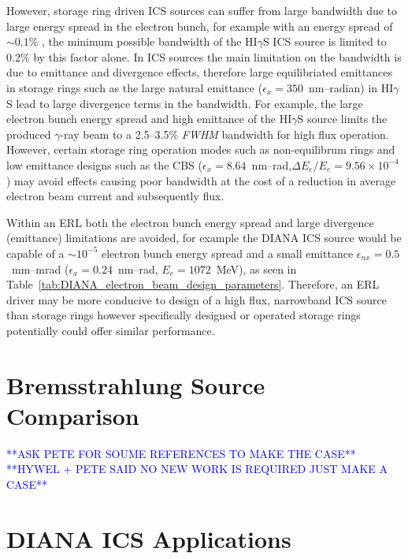 \documentclass[../main.tex]{subfiles}
\begin{document}
However, storage ring driven ICS sources can suffer from large bandwidth due to large energy spread in the electron bunch, for example with an energy spread of $\sim0.1$\% \cite{litvinenko1996intense}, the minimum possible bandwidth of the HI$\gamma$S ICS source is limited to 0.2\% by this factor alone. In ICS sources the main limitation on the bandwidth is due to emittance and divergence effects, therefore large equilibriated emittances in storage rings such as the large natural emittance ($\epsilon_{x} = 350$~\si{\nano\meter}--\si{radian}) in HI$\gamma$S \cite{weller2009research} lead to large divergence terms in the bandwidth. For example, the large electron bunch energy spread and high emittance of the HI$\gamma$S source limits the produced $\gamma$-ray beam to a 2.5--3.5\% \textit{FWHM} bandwidth \cite{weller2009research} for high flux operation. However, certain storage ring operation modes such as non-equilibrum rings \cite{huang1998laser,owen2013nonequilibrium} and low emittance designs such as the CBS \cite{pan2019design} ($\epsilon_{x} = 8.64$~\si{\nano\meter}--\si{\radian},$\Delta E_{e}/E_{e} = 9.56\times 10^{-4}$) may avoid effects causing poor bandwidth at the cost of a reduction in average electron beam current and subsequently flux.     

Within an ERL both the electron bunch energy spread and large divergence (emittance) limitations are avoided, for example the DIANA ICS source would be capable of a $\sim10^{-5}$ electron bunch energy spread and a small emittance $\epsilon_{nx} = 0.5$~\si{\milli\meter}--\si{\milli\radian} ($\epsilon_{x} = 0.24$~\si{\nano\meter}--\si{\radian}, $E_{e} = 1072$~\si{\mega\electronvolt}), as seen in Table~\ref{tab:DIANA_electron_beam_design_parameters}. Therefore, an ERL driver may be more conducive to design of a high flux, narrowband ICS source than storage rings however specifically designed or operated storage rings potentially could offer similar performance.

\section{Bremsstrahlung Source Comparison}

\textcolor{blue}{**ASK PETE FOR SOUME REFERENCES TO MAKE THE CASE** \\ **HYWEL + PETE SAID NO NEW WORK IS REQUIRED JUST MAKE A CASE**}

\section{DIANA ICS Applications}
\end{document}
